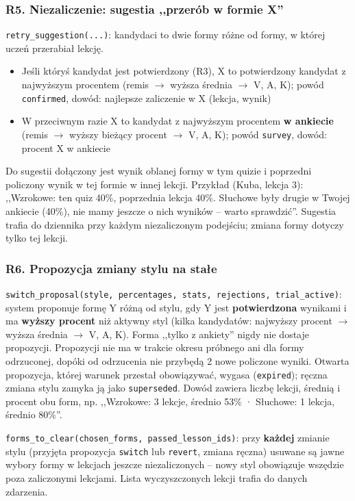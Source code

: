 \subsubsection{R5. Niezaliczenie: sugestia ,,przerób w formie X''}
\texttt{retry\_suggestion(...)}: kandydaci to dwie formy różne od formy, w której uczeń przerabiał lekcję.
\begin{itemize}[leftmargin=*]
    \item Jeśli któryś kandydat jest potwierdzony (R3), X to potwierdzony kandydat z najwyższym procentem (remis $\to$ wyższa średnia $\to$ V, A, K); powód \texttt{confirmed}, dowód: najlepsze zaliczenie w X (lekcja, wynik)
    \item W przeciwnym razie X to kandydat z najwyższym procentem \textbf{w ankiecie} (remis $\to$ wyższy bieżący procent $\to$ V, A, K); powód \texttt{survey}, dowód: procent X w ankiecie
\end{itemize}
Do sugestii dołączony jest wynik oblanej formy w tym quizie i poprzedni policzony wynik w tej formie w innej lekcji. Przykład (Kuba, lekcja 3): ,,Wzrokowe: ten quiz 40\%, poprzednia lekcja 40\%. Słuchowe były drugie w Twojej ankiecie (40\%), nie mamy jeszcze o nich wyników -- warto sprawdzić''. Sugestia trafia do dziennika przy każdym niezaliczonym podejściu; zmiana formy dotyczy tylko tej lekcji.

\subsubsection{R6. Propozycja zmiany stylu na stałe}
\texttt{switch\_proposal(style, percentages, stats, rejections, trial\_active)}: system proponuje formę Y różną od stylu, gdy Y jest \textbf{potwierdzona} wynikami i ma \textbf{wyższy procent} niż aktywny styl (kilka kandydatów: najwyższy procent $\to$ wyższa średnia $\to$ V, A, K). Forma ,,tylko z ankiety'' nigdy nie dostaje propozycji. Propozycji nie ma w trakcie okresu próbnego ani dla formy odrzuconej, dopóki od odrzucenia nie przybędą 2 nowe policzone wyniki. Otwarta propozycja, której warunek przestał obowiązywać, wygasa (\texttt{expired}); ręczna zmiana stylu zamyka ją jako \texttt{superseded}. Dowód zawiera liczbę lekcji, średnią i procent obu form, np. ,,Wzrokowe: 3 lekcje, średnio 53\% · Słuchowe: 1 lekcja, średnio 80\%''.

\texttt{forms\_to\_clear(chosen\_forms, passed\_lesson\_ids)}: przy \textbf{każdej} zmianie stylu (przyjęta propozycja \texttt{switch} lub \texttt{revert}, zmiana ręczna) usuwane są jawne wybory formy w lekcjach jeszcze niezaliczonych -- nowy styl obowiązuje wszędzie poza zaliczonymi lekcjami. Lista wyczyszczonych lekcji trafia do danych zdarzenia.

